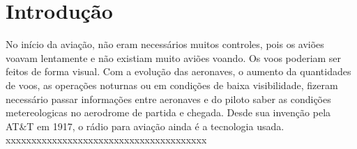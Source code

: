 \chapter{Introdução}
No início da aviação, não eram necessários muitos controles, pois os
aviões voavam lentamente e não existiam muito aviões voando. Os voos
poderiam ser feitos de forma visual. 
Com a evolução das aeronaves, o aumento da quantidades de voos, as
operações noturnas ou em condições de baixa visibilidade, fizeram
necessário passar informações entre aeronaves e do piloto saber
as condições metereologicas no aerodrome de partida e chegada.
Desde sua invenção pela AT\&T em 1917, o rádio para aviação ainda 
é a tecnologia usada. 
xxxxxxxxxxxxxxxxxxxxxxxxxxxxxxxxxxxxxxx